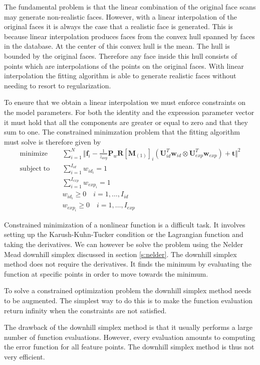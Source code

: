 \documentclass[11pt,a4paper]{report}
\begin{document}
The fundamental problem is that the linear
combination of the original face scans may generate non-realistic faces. However, with a linear interpolation of
the original faces it is always the case that a realistic face is
generated. This is because linear interpolation produces faces from the convex hull spanned by
faces in the database. At the center of this convex hull is the mean. The hull
is bounded by the original faces. Therefore any face inside this hull consists
of points which are interpolations of the points on the original faces. With linear interpolation the fitting algorithm is able to generate realistic faces without needing to resort to regularization.

To ensure that we obtain a linear interpolation we must enforce constraints on
the model parameters. For both the identity and the expression parameter vector
it must hold that all the components are greater or equal to zero and
that they sum to one. The constrained minimzation problem that the fitting
algorithm must solve is therefore given by
\begin{align}\label{eq:optprob}
\mathrm{minimize}\quad &\sum_{i=1}^N \Big\Vert\mathbf{f}_i - \frac{1}{z_{avg}}\mathbf{P}_w\mathbf{R}[\mathbf{M}_{(1)}]_{i}(\mathbf{U}_{id}^T\mathbf{w}_{id} \otimes
\mathbf{U}_{exp}^T\mathbf{w}_{exp}) + \mathbf{t}\Big\Vert^2\\
\mathrm{subject\; to}\quad &\sum_{i=1}^{I_{id}} w_{id_i} = 1\\
&\sum_{i=1}^{I_{exp}} w_{exp_i} = 1\\
\label{eq:nonneg1}
&w_{id_i} \ge 0 \quad i=1,\ldots ,I_{id}\\\label{eq:nonneg2}
&w_{exp_i} \ge 0 \quad i=1,\ldots ,I_{exp}
\end{align}

Constrained minimization of a nonlinear function is a difficult task. It
involves setting up the Karush-Kuhn-Tucker condition or the Lagrangian function
and taking the derivatives. We can however be solve the problem using the Nelder
Mead downhill simplex discussed in section \ref{s:nelder}. The downhill simplex
method does not require the derivatives. It finds the minimum by evaluating the
function at specific points in order to move towards the minimum. 

To solve a constrained optimization problem the downhill simplex method needs to
be augmented. The simplest way to do this is to make the function evaluation
return infinity when the constraints are not satisfied. 

The drawback of the downhill simplex method is that it usually performs a large
number of function evaluations. However, every evaluation amounts to computing the
error function for all feature points. The downhill simplex method is thus not
very efficient.
\end{document}
